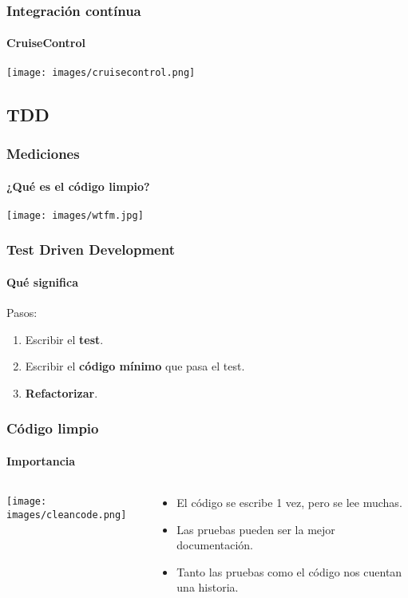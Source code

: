   \begin{frame}
   \frametitle{Integración contínua}
   \framesubtitle{CruiseControl}

   \begin{center}
    \texttt{[image: images/cruisecontrol.png]}
   \end{center}
  \end{frame}



  \subsection{TDD}

  \begin{frame}
   \frametitle{Mediciones}
   \framesubtitle{¿Qué es el código limpio?}

   \begin{center}
    \texttt{[image: images/wtfm.jpg]}
   \end{center}
  \end{frame}



  \begin{frame}
   \frametitle{Test Driven Development}
   \framesubtitle{Qué significa}

   Pasos:
   \begin{enumerate}
    \item<+-> Escribir el \textbf{test}.
    \item<+-> Escribir el \textbf{código mínimo} que pasa el test.
    \item<+-> \textbf{Refactorizar}.
   \end{enumerate}
  \end{frame}


  \begin{frame}
   \frametitle{Código limpio}
   \framesubtitle{Importancia}
   \begin{columns}
    \begin{column}{4cm}
     \texttt{[image: images/cleancode.png]}
    \end{column}
    \begin{column}{7cm}
     \begin{itemize}
      \item<+-> El código se escribe 1 vez, pero se lee muchas.
      \item<+-> Las pruebas pueden ser la mejor documentación.
      \item<+-> Tanto las pruebas como el código nos cuentan una historia.
     \end{itemize}
    \end{column}
   \end{columns}
  \end{frame}


